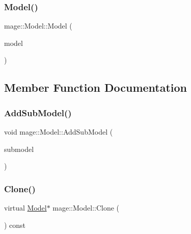 \hypertarget{classmage_1_1_model_a71abc57cde3bd6270de88bfa3aa47601}{}\label{classmage_1_1_model_a71abc57cde3bd6270de88bfa3aa47601} 
\subsubsection{\texorpdfstring{Model()}{Model()}\hspace{0.1cm}{\footnotesize\ttfamily [3/3]}}
{\footnotesize\ttfamily mage\+::\+Model\+::\+Model (\begin{DoxyParamCaption}\item[{\hyperlink{classmage_1_1_model}{Model} \&\&}]{model }\end{DoxyParamCaption})\hspace{0.3cm}{\ttfamily [protected]}}



\subsection{Member Function Documentation}
\hypertarget{classmage_1_1_model_abf3f207329b5d4482e515e206e856295}{}\label{classmage_1_1_model_abf3f207329b5d4482e515e206e856295} 
\subsubsection{\texorpdfstring{Add\+Sub\+Model()}{AddSubModel()}}
{\footnotesize\ttfamily void mage\+::\+Model\+::\+Add\+Sub\+Model (\begin{DoxyParamCaption}\item[{\hyperlink{classmage_1_1_sub_model}{Sub\+Model} $\ast$}]{submodel }\end{DoxyParamCaption})}

\hypertarget{classmage_1_1_model_ae5e9bee52da0db8c7a29920c13ed40ea}{}\label{classmage_1_1_model_ae5e9bee52da0db8c7a29920c13ed40ea} 
\subsubsection{\texorpdfstring{Clone()}{Clone()}}
{\footnotesize\ttfamily virtual \hyperlink{classmage_1_1_model}{Model}$\ast$ mage\+::\+Model\+::\+Clone (\begin{DoxyParamCaption}{ }\end{DoxyParamCaption}) const\hspace{0.3cm}{\ttfamily [pure virtual]}}



